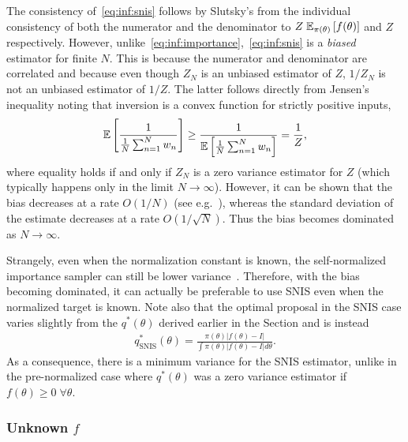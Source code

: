 The consistency of~\eqref{eq:inf:snis} follows by Slutsky's
 from the individual consistency of both the numerator and the denominator to 
$Z\;\mathbb{E}_{\pi(\theta)} \left[f(\theta)\right]$ and $Z$ respectively.
However, unlike~\eqref{eq:inf:importance},~\eqref{eq:inf:snis} is a \emph{biased} estimator
for finite $N$.  This is
because the numerator and denominator are correlated and because 
even though $Z_N$ is an unbiased estimator of $Z$, $1/Z_N$ is not an unbiased
estimator of $1/Z$. The latter follows directly from Jensen's inequality
noting that inversion is a convex function for strictly positive inputs,
\begin{align}
\mathbb{E} \left[\frac{1}{\frac{1}{N}\sum_{n=1}^{N} w_n}\right] \ge \frac{1}{\mathbb{E} \left[\frac{1}{N}\sum_{n=1}^{N} w_n\right]} = \frac{1}{Z},
\end{align}
where equality holds if and only if $Z_N$ is a zero variance estimator for $Z$ (which
typically happens only in the limit $N\rightarrow\infty$).  However, it can be shown that the
bias decreases at a rate $O(1/N)$ (see e.g.~\cite{doucet2009tutorial}), whereas the
standard deviation of the estimate decreases at a rate $O(1/\sqrt{N})$.  Thus the bias
becomes dominated as $N\rightarrow\infty$.

Strangely, even when the normalization constant
is known, the self-normalized importance sampler can still be lower variance~\citep{owen2013mc}.
Therefore, with the bias becoming dominated, it can actually be preferable to use
SNIS even when the normalized target is known.  Note also that the optimal proposal in
the SNIS case varies slightly from the $q^*(\theta)$ derived earlier in the Section
and is instead~\citep{hesterberg1988advances}
\begin{align}
q^*_{\mathrm{SNIS}} (\theta) = \frac{\pi(\theta)\left|f(\theta)-I\right|}
{\int \pi(\theta)\left|f(\theta)-I\right|d\theta}.
\end{align}
As a consequence, there is a minimum variance for the SNIS estimator, unlike in the
pre-normalized case where $q^*(\theta)$ was a zero variance estimator 
if $f(\theta)\ge0 \; \forall \theta$.

\subsubsection{Unknown $f$}
\label{sec:inf:foundation:importance:unk-f}

